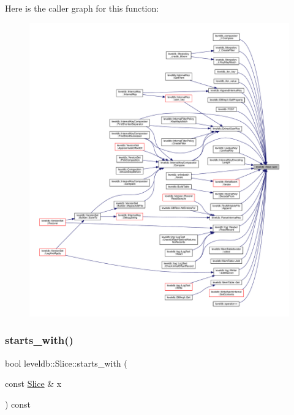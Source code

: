 Here is the caller graph for this function\+:
\nopagebreak
\begin{figure}[H]
\begin{center}
\leavevmode
\includegraphics[width=350pt]{classleveldb_1_1_slice_a7344120beda110de81d0c45d4cfe4b63_icgraph}
\end{center}
\end{figure}
\mbox{\label{classleveldb_1_1_slice_ae1c0a7f51a18a83bbeebfb300bf23767}} 
\subsubsection{\texorpdfstring{starts\_with()}{starts\_with()}}
{\footnotesize\ttfamily bool leveldb\+::\+Slice\+::starts\+\_\+with (\begin{DoxyParamCaption}\item[{const \mbox{\hyperlink{classleveldb_1_1_slice}{Slice}} \&}]{x }\end{DoxyParamCaption}) const\hspace{0.3cm}{\ttfamily [inline]}}

